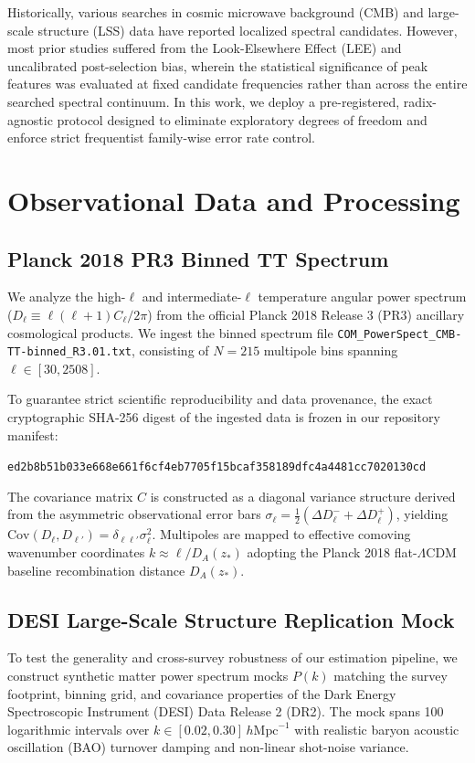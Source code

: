 \documentclass[10pt,twocolumn,a4paper]{article}
\begin{document}
Historically, various searches in cosmic microwave background (CMB) and large-scale structure (LSS) data have reported localized spectral candidates. However, most prior studies suffered from the Look-Elsewhere Effect (LEE) and uncalibrated post-selection bias, wherein the statistical significance of peak features was evaluated at fixed candidate frequencies rather than across the entire searched spectral continuum. In this work, we deploy a pre-registered, radix-agnostic protocol designed to eliminate exploratory degrees of freedom and enforce strict frequentist family-wise error rate control.

\section{Observational Data and Processing}
\subsection{Planck 2018 PR3 Binned TT Spectrum}
We analyze the high-$\ell$ and intermediate-$\ell$ temperature angular power spectrum ($D_\ell \equiv \ell(\ell+1)C_\ell/2\pi$) from the official Planck 2018 Release 3 (PR3) ancillary cosmological products. We ingest the binned spectrum file \texttt{COM\_PowerSpect\_CMB-TT-binned\_R3.01.txt}, consisting of $N = 215$ multipole bins spanning $\ell \in [30, 2508]$. 

To guarantee strict scientific reproducibility and data provenance, the exact cryptographic SHA-256 digest of the ingested data is frozen in our repository manifest:
\begin{center}
\texttt{ed2b8b51b033e668e661f6cf4eb7705f15bcaf358189dfc4a4481cc7020130cd}
\end{center}
The covariance matrix $C$ is constructed as a diagonal variance structure derived from the asymmetric observational error bars $\sigma_\ell = \frac{1}{2}(\Delta D_\ell^- + \Delta D_\ell^+)$, yielding $\mathrm{Cov}(D_\ell, D_{\ell'}) = \delta_{\ell \ell'} \sigma_\ell^2$. Multipoles are mapped to effective comoving wavenumber coordinates $k \approx \ell / D_A(z_*)$ adopting the Planck 2018 flat-$\Lambda$CDM baseline recombination distance $D_A(z_*)$.

\subsection{DESI Large-Scale Structure Replication Mock}
To test the generality and cross-survey robustness of our estimation pipeline, we construct synthetic matter power spectrum mocks $P(k)$ matching the survey footprint, binning grid, and covariance properties of the Dark Energy Spectroscopic Instrument (DESI) Data Release 2 (DR2). The mock spans 100 logarithmic intervals over $k \in [0.02, 0.30]\,h\mathrm{Mpc}^{-1}$ with realistic baryon acoustic oscillation (BAO) turnover damping and non-linear shot-noise variance.
\end{document}
